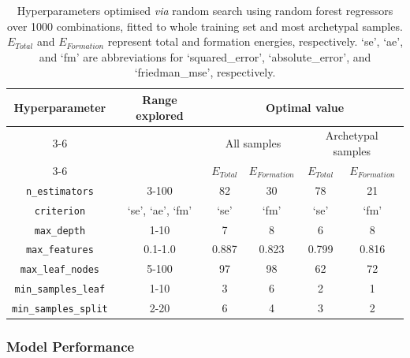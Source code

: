 \documentclass{WileyMSP-template}
\begin{document}
\begin{table}[hp!]
    \caption{Hyperparameters optimised \textit{via} random search using random forest regressors over 1000 combinations, fitted to whole training set and most archetypal samples. $E_{Total}$ and $E_{Formation}$ represent total and formation energies, respectively. `se', `ae', and `fm' are abbreviations for `squared\_error', `absolute\_error', and `friedman\_mse', respectively.}
    \centering
    \small
    \begin{tabular}{c|c|cc|cc}
        \hline
        Hyperparameter               &   Range explored &                                        \multicolumn{4}{c}{Optimal value} \\
        \cline{3-6}
                                     &                  & \multicolumn{2}{c}{All samples} & \multicolumn{2}{c}{Archetypal samples} \\
        \cline{3-6}
                                     &                  &  $E_{Total}$ &  $E_{Formation}$ &     $E_{Total}$ &      $E_{Formation}$ \\
        \hline
        \texttt{n\_estimators}       &            3-100 &           82 &              30  &              78 &                   21 \\
        \texttt{criterion}           & `se', `ae', `fm' &         `se' &             `fm' &            `se' &                 `fm' \\
        \texttt{max\_depth}          &             1-10 &            7 &                8 &               6 &                    8 \\
        \texttt{max\_features}       &          0.1-1.0 &        0.887 &            0.823 &           0.799 &                0.816 \\
        \texttt{max\_leaf\_nodes}    &            5-100 &           97 &               98 &              62 &                   72 \\
        \texttt{min\_samples\_leaf}  &             1-10 &            3 &                6 &               2 &                    1 \\
        \texttt{min\_samples\_split} &             2-20 &            6 &                4 &               3 &                    2 \\
        \hline
    \end{tabular}
    \label{tab:RFoptimisedHP}
\end{table}

\subsubsection{Model Performance}
\label{sec:modelPerformance}
\end{document}
